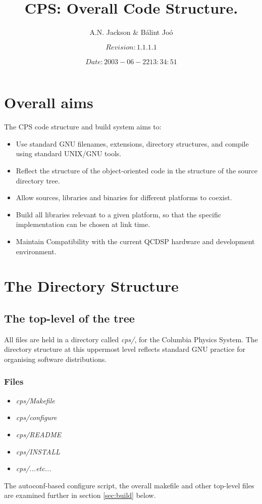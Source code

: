 \documentclass[12pt]{article}
\title{CPS: Overall Code Structure.}
\author{A.N. Jackson \& B\'{a}lint Jo\'{o}}
\date{\mbox{\small $$Revision: 1.1.1.1 $$  $$Date: 2003-06-22 13:34:51 $$}}
\begin{document}
\maketitle

\tableofcontents
\newpage

\section{Overall aims}
The CPS code structure and build system aims to:
\begin{itemize}
\setlength{\itemsep}{0.0cm}
 \item Use standard GNU filenames, extensions, directory structures, and
 compile using standard UNIX/GNU tools.
 \item Reflect the structure of the object-oriented code in the structure of
 the source directory tree.
 \item Allow sources, libraries and binaries for different platforms to coexist.
 \item Build all libraries relevant to a given platform, so that the specific
 implementation can be chosen at link time.
\item Maintain Compatibility with the current QCDSP hardware and development environment.
\end{itemize}

\section{The Directory Structure}
\label{sec:dirs}

\subsection{The top-level of the tree}
All files are held in a directory called \emph{cps/}, for the Columbia Physics System.
The directory structure at this uppermost level reflects standard GNU practice
for organising software distributions.

\subsubsection{Files}
\begin{itemize}
\setlength{\itemsep}{0.0cm}
 \item \emph{cps/Makefile}
 \item \emph{cps/configure}
 \item \emph{cps/README}
 \item \emph{cps/INSTALL}
 \item \emph{cps/...etc...}
\end{itemize}
The autoconf-based configure script, the overall makefile and other top-level 
files are examined further in section \ref{sec:build} below.
\end{document}

